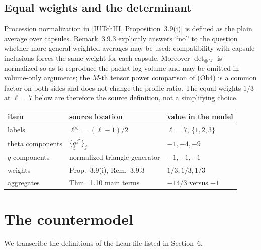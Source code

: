 \documentclass[11pt]{article}
\newcommand{\uu}[1]{\underline{\underline{#1}}}
\theoremstyle{definition}
\begin{document}
\subsection{Equal weights and the determinant}

Procession normalization in [IUTchIII, Proposition~3.9(i)] is
defined as the plain average over capsules.  Remark~3.9.3
explicitly answers ``no'' to the question whether more general
weighted averages may be used: compatibility with capsule
inclusions forces the same weight for each capsule.  Moreover
$\det_{\otimes M}$ is normalized so as to reproduce the packet
log-volume and may be omitted in volume-only arguments; the
$M$-th tensor power comparison of (Ob4) is a common factor on
both sides and does not change the profile ratio.  The equal
weights $1/3$ at $\ell=7$ below are therefore the source
definition, not a simplifying choice.

\begin{center}
\begin{tabular}{lll}
\toprule
item & source location & value in the model\\
\midrule
labels &
$\ell^\divideontimes=(\ell-1)/2$ &
$\ell=7$, $\{1,2,3\}$\\
theta components &
$\{\uu q^{\,j^2}\}_j$ &
$-1,-4,-9$\\
$q$ components &
normalized triangle generator &
$-1,-1,-1$\\
weights &
Prop.~3.9(i), Rem.~3.9.3 &
$1/3,1/3,1/3$\\
aggregates &
Thm.~1.10 main terms &
$-14/3$ versus $-1$\\
\bottomrule
\end{tabular}
\end{center}

\section{The countermodel}

We transcribe the definitions of the Lean file listed in
Section~6.
\end{document}
